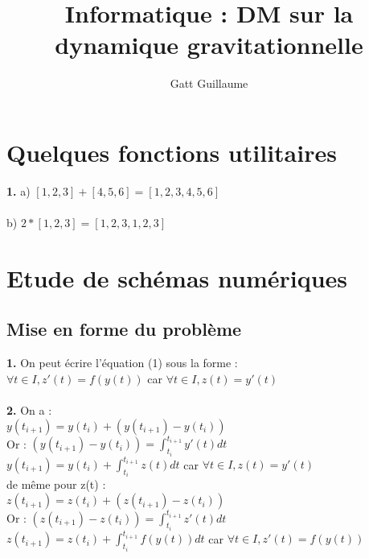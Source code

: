 \documentclass{article}
\begin{document}
\title{Informatique : DM sur la dynamique gravitationnelle}
\date{}
\author{Gatt Guillaume}
\maketitle
\renewcommand{\thesection}{\Roman{section}}
	\setlength{\parindent}{1.5cm}
\section{Quelques fonctions utilitaires }
{\bf 1.} a) $[1,2,3] + [4,5,6]=[1,2,3,4,5,6]$ \\
\\
b) $2 *[1,2,3]=[1,2,3,1,2,3]$

\section{Etude de schémas numériques}
\subsection{Mise en forme du problème }
{\bf 1.} On peut écrire l'équation (1) sous la forme : \\
$\forall t \in I, z'(t)=f(y(t))$ car $\forall t \in I, z(t)=y'(t)$ \\
 \\
{\bf 2.} On a : \\
$y(t_{i+1})= y(t_i) + (y(t_{i+1}) - y(t_i))$ \\
Or : $(y(t_{i+1}) - y(t_i))=\int_{t_i}^{t_{i+1}}y'(t)dt$ \\
$y(t_{i+1})=y(t_i)+ \int_{t_i}^{t_{i+1}}z(t)dt$ car $\forall t \in I, z(t)=y'(t)$\\
de même pour z(t) : \\
$z(t_{i+1})= z(t_i) + (z(t_{i+1}) - z(t_i))$ \\
Or : $(z(t_{i+1}) - z(t_i))=\int_{t_i}^{t_{i+1}}z'(t)dt$ \\
$z(t_{i+1})=z(t_i)+ \int_{t_i}^{t_{i+1}}f(y(t))dt$ car $\forall t \in I, z'(t)=f(y(t))$
\end{document}
